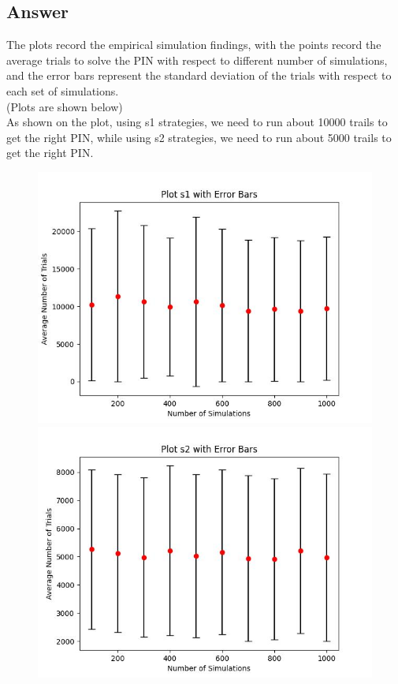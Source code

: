 \subsection{Answer}
The plots record the empirical simulation findings, with the points record the average trials to 
solve the PIN with respect to different number of simulations, and the error bars represent the 
standard deviation of the trials with respect to each set of simulations.\\
(Plots are shown below)\\
As shown on the plot, using s1 strategies, we need to run about 10000 trails to get the right PIN,
while using s2 strategies, we need to run about 5000 trails to get the right PIN.
\begin{figure}[h]
 	\includegraphics[width=0.5\linewidth]{s1plot.jpeg}
	\includegraphics[width=0.5\linewidth]{s2plot.jpeg}
	\hfill
	\label{fig:label}
\end{figure}

